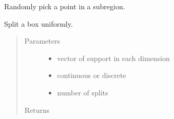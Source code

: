 \documentclass[letterpaper,10pt,english]{sphinxmanual}
\begin{document}

\begin{fulllineitems}
\label{\detokenize{index:ho.utils_ho.std_rand}}
Randomly pick a point in a subregion.

\end{fulllineitems}


\begin{fulllineitems}
\label{\detokenize{index:ho.utils_ho.std_split}}
Split a box uniformly.
\begin{quote}\begin{description}
\item[{Parameters}] \leavevmode\begin{itemize}
\item {} 
 \textendash{} vector of support in each dimension

\item {} 
 \textendash{} continuous or discrete

\item {} 
 \textendash{} number of splits

\end{itemize}

\item[{Returns}] \leavevmode


\end{description}\end{quote}

\end{fulllineitems}

\end{document}
